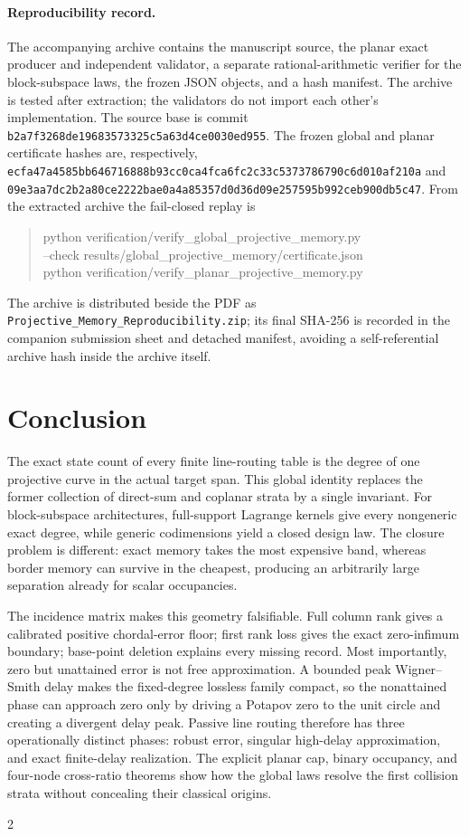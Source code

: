\documentclass[11pt]{article}
\theoremstyle{definition}\newtheorem{definition}[theorem]{Definition}\newtheorem{example}[theorem]{Example}
\theoremstyle{remark}\newtheorem{remark}[theorem]{Remark}\newtheorem{limitation}[theorem]{Limitation}
\begin{document}
\paragraph{Reproducibility record.}
The accompanying archive contains the manuscript source, the planar exact
producer and independent validator, a separate rational-arithmetic verifier
for the block-subspace laws, the frozen JSON objects, and a hash manifest.  The
archive is tested after extraction; the validators do not import each other's
implementation.  The source base is commit
\nolinkurl{b2a7f3268de19683573325c5a63d4ce0030ed955}.  The frozen global and
planar certificate hashes are, respectively,
\nolinkurl{ecfa47a4585bb646716888b93cc0ca4fca6fc2c33c5373786790c6d010af210a}
and
\nolinkurl{09e3aa7dc2b2a80ce2222bae0a4a85357d0d36d09e257595b992ceb900db5c47}.
From the extracted archive the fail-closed replay is
\begin{quote}\small\ttfamily
python verification/verify\_global\_projective\_memory.py\\
\hspace*{1em}--check results/global\_projective\_memory/certificate.json\\
python verification/verify\_planar\_projective\_memory.py
\end{quote}
The
archive is distributed beside the PDF as
\texttt{Projective\_Memory\_Reproducibility.zip}; its final SHA-256 is recorded
in the companion submission sheet and detached manifest, avoiding a
self-referential archive hash inside the archive itself.

\section{Conclusion}

The exact state count of every finite line-routing table is the degree of one
projective curve in the actual target span.  This global identity replaces the
former collection of direct-sum and coplanar strata by a single invariant.
For block-subspace architectures, full-support Lagrange kernels give every
nongeneric exact degree, while generic codimensions yield a closed design law.
The closure problem is different: exact memory takes the most expensive band,
whereas border memory can survive in the cheapest, producing an arbitrarily
large separation already for scalar occupancies.

The incidence matrix makes this geometry falsifiable.  Full column rank gives
a calibrated positive chordal-error floor; first rank loss gives the exact
zero-infimum boundary; base-point deletion explains every missing record.
Most importantly, zero but unattained error is not free approximation.  A
bounded peak Wigner--Smith delay makes the fixed-degree lossless family compact,
so the nonattained phase can approach zero only by driving a Potapov zero to the
unit circle and creating a divergent delay peak.  Passive line routing therefore
has three operationally distinct phases: robust error, singular high-delay
approximation, and exact finite-delay realization.  The explicit planar cap,
binary occupancy, and four-node cross-ratio theorems show how the global laws
resolve the first collision strata without concealing their classical origins.

\clearpage
\begin{multicols}{2}


\end{multicols}
\end{document}
